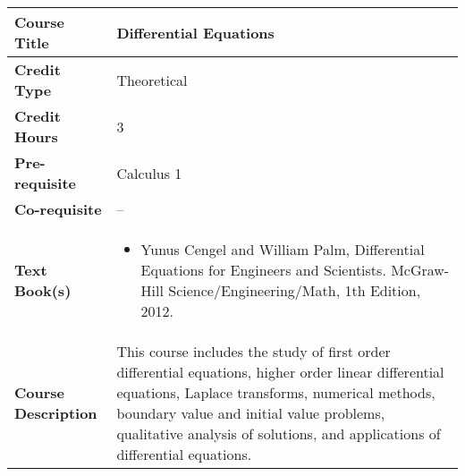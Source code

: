 \documentclass[11pt]{article}
\begin{document}
\begin{table}[h!]
\begin{tabular}{|l|l|}
\hline
\textbf{Course Title}       &  Differential Equations \\ \hline
\textbf{Credit Type}        &  Theoretical \\ \hline
\textbf{Credit Hours}       &  3 \\ \hline
\textbf{Pre-requisite}       & Calculus 1 \\ \hline
\textbf{Co-requisite}       &  -- \\ \hline
\textbf{Text Book(s)}       & \begin{minipage}{.70\textwidth}
\begin{itemize} \itemsep-0.4em
	\vspace{3mm}
	\item Yunus Cengel and William Palm, Differential Equations for Engineers and Scientists. McGraw-Hill Science/Engineering/Math, 1th Edition, 2012.
	\vspace{3mm}
\end{itemize}
\end{minipage}\\ \hline
\textbf{Course Description} & \begin{minipage}{.70\textwidth}
\vspace{3mm}
This course includes the study of first order differential equations, higher order linear
differential equations, Laplace transforms, numerical methods, boundary value and initial value
problems, qualitative analysis of solutions, and applications of differential equations.

\vspace{3mm}
\end{minipage} \\ \hline
\end{tabular}
\end{table}
\end{document}
